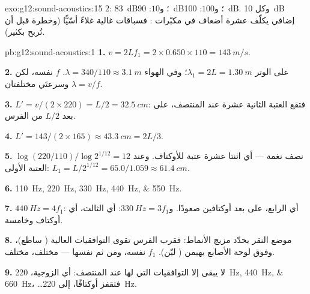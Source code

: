 \begin{solution}{exo:g12:sound-acoustics:15}
$2$: \qty{83}{dB}؛ و$10$: \qty{90}{dB}؛ و$100$: \qty{100}{dB}. وكل
\qty{+10}{dB} إضافي يكلّف عشرة أضعاف في مكبّرات : فسباقات 
غالية غلاءً أسّيًّا (وخطرة قبل أن تُربح بكثير).
\end{solution}

\begin{solution}{pb:g12:sound-acoustics:1}
\textbf{1.} $v = 2Lf_1 = 2 \times 0.650 \times 110 = \qty{143}{m/s}$.

\textbf{2.} على الوتر $\lambda_1 = 2L = \qty{1.30}{m}$؛ وفي الهواء
$\lambda = 340/110 \approx \qty{3.1}{m}$.  $f$ نفسه، لكن
$\lambda = v/f$ وسرعتَي  مختلفتان.

\textbf{3.} $L' = v/(2 \times 220) = L/2 = \qty{32.5}{cm}$: فتقع العتبة
الثانية عشرة عند المنتصف، على بعد $L/2$ من الفرس.

\textbf{4.} $L' = 143/(2 \times 165) \approx \qty{43.3}{cm} = 2L/3$.

\textbf{5.} $\log(220/110)/\log 2^{1/12} = 12$ نصف نغمة --- أي اثنتا عشرة
عتبة للأوكتاف. وعند العتبة الأولى: $L_1 = L/2^{1/12} = 65.0/1.059
\approx \qty{61.4}{cm}$.

\textbf{6.} \qtylist{110;220;330;440;550}{Hz}.

\textbf{7.} $\qty{440}{Hz} = 4f_1$: أي  الرابع، على بعد أوكتافين
صعودًا. و$\qty{330}{Hz} = 3f_1$: أي  الثالث، أي أوكتاف
وخامسة.

\textbf{8.} موضع النقر يحدّد مزيج الأنماط: فقرب الفرس تقوى
التوافقيات العالية ( ساطع)، وفوق لوحة الأصابع يهيمن
 ( ليّن).  $f_1$ نفسه، ومن ثم  نفسها ---
 مختلف،  مختلف.

\textbf{9.} لا يبقى إلا التوافقيات التي لها  عند المنتصف: أي
الزوجية، \qtylist{220;440;660}{Hz}، \dots فتقفز 
أوكتافًا، إلى \qty{220}{Hz}.


\end{solution}

